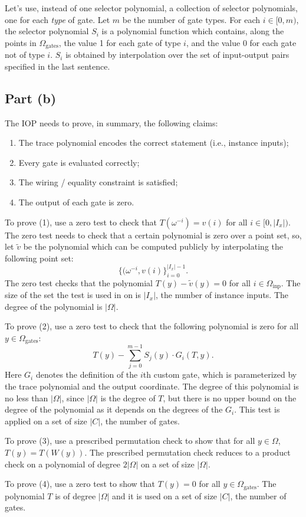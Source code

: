 \documentclass[11pt]{article}
\begin{document}
Let's use, instead of one selector polynomial, a collection of selector polynomials, one for each \emph{type}\/
of gate. Let $m$ be the number of gate types. For each $i \in [0,m)$, the selector polynomial $S_i$ is a
polynomial function which contains, along the points in $\Omega_{\text{gates}}$, the value 1 for each gate
of type $i$, and the value 0 for each gate not of type $i$. $S_i$ is obtained by interpolation over the
set of input-output pairs specified in the last sentence.

\subsection{Part (b)}

The IOP needs to prove, in summary, the following claims:

\begin{enumerate}
	\item The trace polynomial encodes the correct statement (i.e., instance inputs);
	\item Every gate is evaluated correctly;
	\item The wiring / equality constraint is satisfied;
	\item The output of each gate is zero.
\end{enumerate}

To prove (1), use a zero test to check that $T(\omega^{-i}) = v(i)$ for all $i \in [0,|I_x|)$.
The zero test needs to check that a certain polynomial is zero over a point set, so,
let $\widetilde{v}$ be the polynomial which can be computed publicly by interpolating the
following point set:
\begin{equation}
	\{(\omega^{-i}, v(i)\}_{i=0}^{|I_x|-1}.
\end{equation}
The zero test checks that the polynomial $T(y) - \widetilde{v}(y) = 0$ for all $i \in \Omega_{\text{inp}}$.
The size of the set the test is used in on is $|I_x|$, the number of instance inputs.
The degree of the polynomial is $|\Omega|$.

To prove (2), use a zero test to check that the following polynomial is zero for all $y \in \Omega_{\text{gates}}$:
\begin{equation}
	T(y) - \sum_{j=0}^{m-1} S_j(y) \cdot G_i(T, y).
\end{equation}
Here $G_i$ denotes the definition of the $i$th custom gate, which is parameterized by the trace polynomial and
the output coordinate. The degree of this polynomial is no less than $|\Omega|$, since $|\Omega|$ is the degree
of $T$, but there is no upper bound on the degree of the polynomial as it depends on the degrees of the $G_i$.
This test is applied on a set of size $|C|$, the number of gates.

To prove (3), use a prescribed permutation check to show that for all $y \in \Omega$, $T(y) = T(W(y))$.
The prescribed permutation check reduces to a product check on a polynomial of degree $2|\Omega|$
on a set of size $|\Omega|$.

To prove (4), use a zero test to show that $T(y) = 0$ for all $y \in \Omega_{\text{gates}}$. 
The polynomial $T$ is of degree $|\Omega|$ and it is used on a set of size $|C|$, the number of gates.
\end{document}
